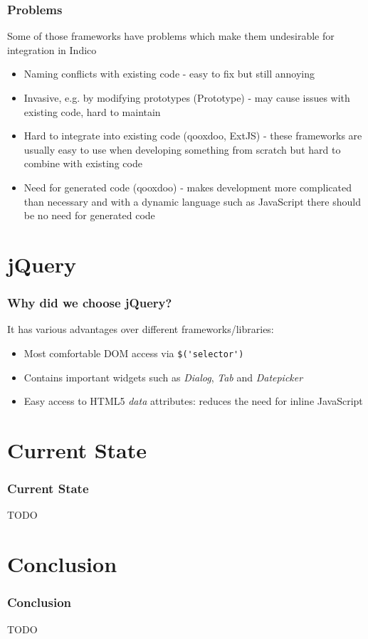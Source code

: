 \documentclass{beamer}
\begin{document}
\begin{frame}
  \frametitle{Problems}
  Some of those frameworks have problems which make them undesirable for integration in Indico
  \begin{itemize}
    \item Naming conflicts with existing code - easy to fix but still annoying
    \item Invasive, e.g. by modifying prototypes (Prototype) - may cause issues with existing code,
      hard to maintain
    \item Hard to integrate into existing code (qooxdoo, ExtJS) - these frameworks are usually easy
      to use when developing something from scratch but hard to combine with existing code
    \item Need for generated code (qooxdoo) - makes development more complicated than necessary and
      with a dynamic language such as JavaScript there should be no need for generated code
  \end{itemize}
\end{frame}

\section{jQuery}
\begin{frame}
  \frametitle{Why did we choose jQuery?}
  It has various advantages over different frameworks/libraries:
  \begin{itemize}
    \item Most comfortable DOM access via \lstinline{$('selector')}
    \item Contains important widgets such as \emph{Dialog}, \emph{Tab} and \emph{Datepicker}
    \item Easy access to HTML5 \emph{data} attributes: reduces the need for inline JavaScript
  \end{itemize}
\end{frame}

\section{Current State}
\begin{frame}
  \frametitle{Current State}
  TODO
\end{frame}

\section{Conclusion}
\begin{frame}
  \frametitle{Conclusion}
  TODO
\end{frame}
\end{document}
